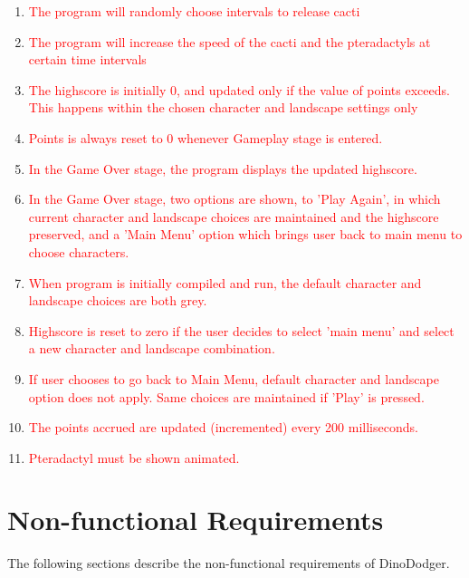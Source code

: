 \documentclass[12pt, titlepage]{article}
\begin{document}
\begin{enumerate}
\item{\textcolor{red}{The program will randomly choose intervals to release cacti}}
\item{\textcolor{red}{The program will increase the speed of the cacti and the pteradactyls at certain time intervals}}
\item{\textcolor{red}{The highscore is initially 0, and updated only if the value of points exceeds. This happens within the chosen character and landscape settings only}}
\item{\textcolor{red}{Points is always reset to 0 whenever Gameplay stage is entered.}}
\item{\textcolor{red}{In the Game Over stage, the program displays the updated highscore.}}
\item{\textcolor{red}{In the Game Over stage, two options are shown, to 'Play Again', in which current character and landscape choices are maintained and the highscore preserved, and a 'Main Menu' option which brings user back to main menu to choose characters.}}
\item{\textcolor{red}{When program is initially compiled and run, the default character and landscape choices are both grey.}}
\item{\textcolor{red}{Highscore is reset to zero if the user decides to select 'main menu' and select a new character and landscape combination.}}
\item{\textcolor{red}{If user chooses to go back to Main Menu, default character and landscape option does not apply. Same choices are maintained if 'Play' is pressed. }}
\item{\textcolor{red}{The points accrued are updated (incremented) every 200 milliseconds.}}
\item{\textcolor{red}{Pteradactyl must be shown animated.}}


\end{enumerate}
\section{Non-functional Requirements}
The following sections describe the non-functional requirements of DinoDodger.
\end{document}

